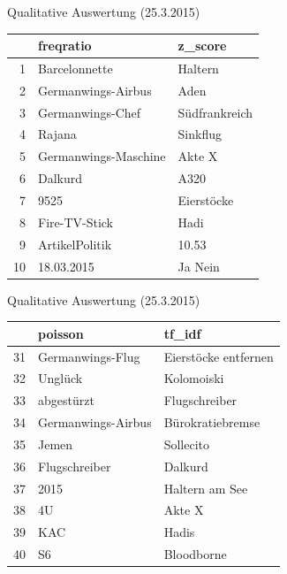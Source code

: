 \documentclass{beamer}
\begin{document}
\begin{frame}{Qualitative Auswertung (25.3.2015)}
\begin{table}[ht]
\centering
\begin{tabular}{rll}
  \hline
 & freqratio & z\_score \\ 
  \hline
1 & Barcelonnette & Haltern \\ 
  2 & Germanwings-Airbus & Aden \\ 
  3 & Germanwings-Chef & Südfrankreich \\ 
  4 & Rajana & Sinkflug \\ 
  5 & Germanwings-Maschine & Akte X \\ 
  6 & Dalkurd & A320 \\ 
  7 & 9525 & Eierstöcke \\ 
  8 & Fire-TV-Stick & Hadi \\ 
  9 & ArtikelPolitik & 10.53 \\ 
  10 & 18.03.2015 & Ja Nein \\ 
   \hline
\end{tabular}
\end{table}
\end{frame}

\begin{frame}{Qualitative Auswertung (25.3.2015)}
\begin{table}[ht]
\centering
\begin{tabular}{rll}
  \hline
 & poisson & tf\_idf \\ 
  \hline
31 & Germanwings-Flug & Eierstöcke entfernen \\ 
  32 & Unglück & Kolomoiski \\ 
  33 & abgestürzt & Flugschreiber \\ 
  34 & Germanwings-Airbus & Bürokratiebremse \\ 
  35 & Jemen & Sollecito \\ 
  36 & Flugschreiber & Dalkurd \\ 
  37 & 2015 & Haltern am See \\ 
  38 & 4U & Akte X \\ 
  39 & KAC & Hadis \\ 
  40 & S6 & Bloodborne \\ 
   \hline
\end{tabular}
\end{table}
\end{frame}
\end{document}
